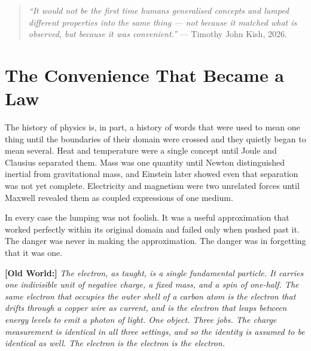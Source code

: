 \documentclass[11pt, letterpaper, openany]{book}
\newcommand{\oldworld}[1]{\noindent\textbf{\color{goldseal}[Old World:]}
  \textit{#1}\medskip}
\begin{document}
\begin{quote}
\textit{``It would not be the first time humans generalised concepts and
lumped different properties into the same thing — not because it matched
what is observed, but because it was convenient.''}
--- Timothy John Kish, 2026.
\end{quote}
 
\section{The Convenience That Became a Law}
 
The history of physics is, in part, a history of words that were used to
mean one thing until the boundaries of their domain were crossed and they
quietly began to mean several. Heat and temperature were a single concept
until Joule and Clausius separated them. Mass was one quantity until Newton
distinguished inertial from gravitational mass, and Einstein later showed
even that separation was not yet complete. Electricity and magnetism were
two unrelated forces until Maxwell revealed them as coupled expressions of
one medium.
 
In every case the lumping was not foolish. It was a useful approximation
that worked perfectly within its original domain and failed only when
pushed past it. The danger was never in making the approximation. The
danger was in forgetting that it was one.
 
\oldworld{The electron, as taught, is a single fundamental particle. It
carries one indivisible unit of negative charge, a fixed mass, and a
spin of one-half. The same electron that occupies the outer shell of a
carbon atom is the electron that drifts through a copper wire as current,
and is the electron that leaps between energy levels to emit a photon of
light. One object. Three jobs. The charge measurement is identical in all
three settings, and so the identity is assumed to be identical as well.
The electron is the electron is the electron.}
 
\end{document}
